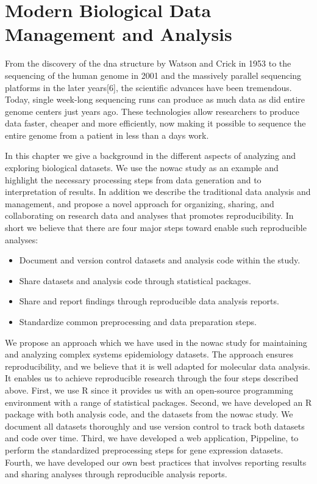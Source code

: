 \chapter{Modern Biological Data Management and Analysis}\label{biodata}
From the discovery of the \gls{dna} structure by Watson and Crick in
1953\cite{watson1953molecular} to the sequencing of the human genome in 2001
\cite{venter2001sequence,international2001initial} and the massively parallel
sequencing platforms in the later years[6], the scientific advances have been
tremendous. Today, single week-long sequencing runs can produce as much data as
did entire genome centers just years ago.\cite{kahn2011future}  These
technologies allow researchers to produce data faster, cheaper and more
efficiently, now making it possible to sequence the entire genome from a patient
in less than a days work. 

In this chapter we give a background in the different aspects of analyzing and
exploring biological datasets. We use the \gls{nowac} study as an example and
highlight the necessary processing steps from data generation and to
interpretation of results. In addition we describe the traditional data analysis
and management, and propose a novel approach for organizing, sharing, and
collaborating on research data and analyses that promotes reproducibility. In
short we believe that there are four major steps toward enable such reproducible
analyses:

\begin{itemize} 
    \item Document and version control datasets and analysis code within the
        study. 
    \item Share datasets and analysis code through statistical packages. 
    \item Share and report findings through reproducible data analysis reports. 
    \item Standardize common preprocessing and data preparation steps.
\end{itemize} 

We propose an approach which we have used in the \gls{nowac} study for
maintaining and analyzing complex systems epidemiology datasets. The approach
ensures reproducibility, and we believe that it is well adapted for molecular
data analysis. It enables us to achieve reproducible research through the four
steps described above. First, we use R since it provides us with an open-source
programming environment with a range of statistical packages.  Second, we have
developed an R package with both analysis code, and the datasets from the
\gls{nowac} study. We document all datasets thoroughly and use version control
to track both datasets and code over time. Third, we have developed a web
application, Pippeline, to perform the standardized preprocessing steps for gene
expression datasets.  Fourth, we have developed our own best practices that
involves reporting results and sharing analyses through reproducible analysis
reports. 

